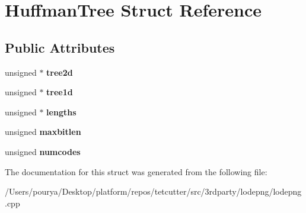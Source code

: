 \hypertarget{structHuffmanTree}{}\section{Huffman\+Tree Struct Reference}
\label{structHuffmanTree}
\subsection*{Public Attributes}
\begin{DoxyCompactItemize}
\item 
\hypertarget{structHuffmanTree_a91160304cb771d2f9f39ee357c9b05a8}{}unsigned $\ast$ {\bfseries tree2d}\label{structHuffmanTree_a91160304cb771d2f9f39ee357c9b05a8}

\item 
\hypertarget{structHuffmanTree_a47b3346a25fe0a3222b595c236ad146e}{}unsigned $\ast$ {\bfseries tree1d}\label{structHuffmanTree_a47b3346a25fe0a3222b595c236ad146e}

\item 
\hypertarget{structHuffmanTree_aef81d45a5c56276c5699a8e9a575021d}{}unsigned $\ast$ {\bfseries lengths}\label{structHuffmanTree_aef81d45a5c56276c5699a8e9a575021d}

\item 
\hypertarget{structHuffmanTree_adf034ca9ce62a4ebfffaaeaba4378a26}{}unsigned {\bfseries maxbitlen}\label{structHuffmanTree_adf034ca9ce62a4ebfffaaeaba4378a26}

\item 
\hypertarget{structHuffmanTree_a608df5a24f60d1077a5cde19d5149e1f}{}unsigned {\bfseries numcodes}\label{structHuffmanTree_a608df5a24f60d1077a5cde19d5149e1f}

\end{DoxyCompactItemize}


The documentation for this struct was generated from the following file\+:\begin{DoxyCompactItemize}
\item 
/\+Users/pourya/\+Desktop/platform/repos/tetcutter/src/3rdparty/lodepng/lodepng.\+cpp\end{DoxyCompactItemize}

